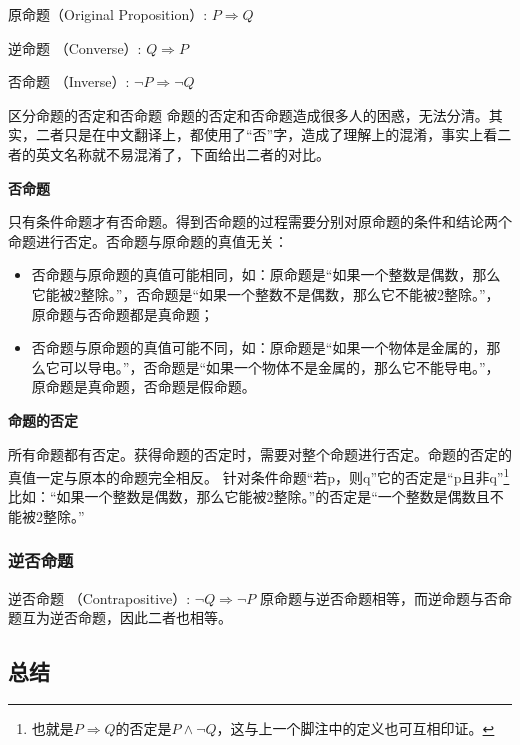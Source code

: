 原命题（Original Proposition）:  $P \Rightarrow Q $

逆命题 （Converse）:  $Q \Rightarrow P$ 

否命题 （Inverse）:  $\neg P \Rightarrow \neg Q $


\begin{example}{区分命题的否定和否命题}
命题的否定和否命题造成很多人的困惑，无法分清。其实，二者只是在中文翻译上，都使用了“否”字，造成了理解上的混淆，事实上看二者的英文名称就不易混淆了，下面给出二者的对比。

\textbf{否命题}

只有条件命题才有否命题。得到否命题的过程需要分别对原命题的条件和结论两个命题进行否定。否命题与原命题的真值无关：
\begin{itemize}
\item 否命题与原命题的真值可能相同，如：原命题是“如果一个整数是偶数，那么它能被2整除。”，否命题是“如果一个整数不是偶数，那么它不能被2整除。”，原命题与否命题都是真命题；
\item 否命题与原命题的真值可能不同，如：原命题是“如果一个物体是金属的，那么它可以导电。”，否命题是“如果一个物体不是金属的，那么它不能导电。”，原命题是真命题，否命题是假命题。
\end{itemize}

\textbf{命题的否定}

所有命题都有否定。获得命题的否定时，需要对整个命题进行否定。命题的否定的真值一定与原本的命题完全相反。
针对条件命题“若p，则q”它的否定是“p且非q”\footnote{也就是$P\Rightarrow Q$的否定是$P\land\neg Q$，这与上一个脚注中的定义也可互相印证。}
比如：“如果一个整数是偶数，那么它能被2整除。”的否定是“一个整数是偶数且不能被2整除。”

\end{example}

\subsubsection{逆否命题}

逆否命题 （Contrapositive）:  $\neg Q \Rightarrow \neg P $
原命题与逆否命题相等，而逆命题与否命题互为逆否命题，因此二者也相等。


\subsection{总结}

